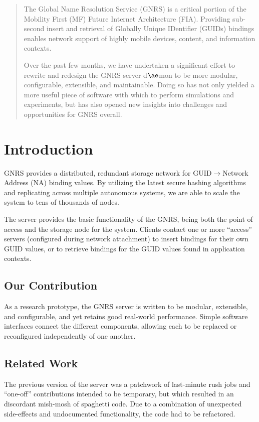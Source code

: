 \documentclass[conference, 11pt]{IEEEtran}
\begin{document}
\maketitle
\begin{abstract}
The Global Name Resolution Service (GNRS) is a critical portion of the
Mobility First (MF) Future Internet Architecture (FIA). Providing sub-second
insert and retrieval of Globally Unique IDentifier (GUIDs) bindings enables
network support of highly mobile devices, content, and information contexts.

Over the past few months, we have undertaken a significant effort to rewrite
and redesign the GNRS server d$\ae$mon to be more modular, configurable,
extensible, and maintainable.  Doing so has not only yielded a more useful
piece of software with which to perform simulations and experiments, but has
also opened new insights into challenges and opportunities for GNRS overall.
\end{abstract}
\section{Introduction}
GNRS provides a distributed, redundant storage network for
GUID$\rightarrow$Network Address (NA) binding values.  By utilizing the latest
secure hashing algorithms and replicating across multiple autonomous systems,
we are able to scale the system to tens of thousands of nodes.  

The server provides the basic functionality of the GNRS, being both the point
of access and the storage node for the system.  Clients contact one or more
``access'' servers (configured during network attachment) to insert bindings
for their own GUID values, or to retrieve bindings for the GUID values found
in application contexts.
\subsection{Our Contribution}
As a research prototype, the GNRS server is written to be modular, extensible,
and configurable, and yet retains good real-world performance.  Simple
software interfaces connect the different components, allowing each to be
replaced or reconfigured independently of one another.
\subsection{Related Work}
The previous version of the server was a patchwork of last-minute rush jobs
and ``one-off'' contributions intended to be temporary, but which resulted in
an discordant mish-mosh of spaghetti code.  Due to a combination of unexpected
side-effects and undocumented functionality, the code had to be refactored.
\end{document}
